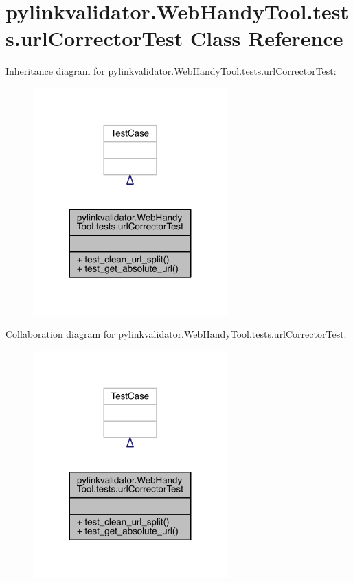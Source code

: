 \hypertarget{classpylinkvalidator_1_1_web_handy_tool_1_1tests_1_1url_corrector_test}{}\section{pylinkvalidator.\+Web\+Handy\+Tool.\+tests.\+url\+Corrector\+Test Class Reference}
\label{classpylinkvalidator_1_1_web_handy_tool_1_1tests_1_1url_corrector_test}


Inheritance diagram for pylinkvalidator.\+Web\+Handy\+Tool.\+tests.\+url\+Corrector\+Test\+:
\nopagebreak
\begin{figure}[H]
\begin{center}
\leavevmode
\includegraphics[width=212pt]{classpylinkvalidator_1_1_web_handy_tool_1_1tests_1_1url_corrector_test__inherit__graph}
\end{center}
\end{figure}


Collaboration diagram for pylinkvalidator.\+Web\+Handy\+Tool.\+tests.\+url\+Corrector\+Test\+:
\nopagebreak
\begin{figure}[H]
\begin{center}
\leavevmode
\includegraphics[width=212pt]{classpylinkvalidator_1_1_web_handy_tool_1_1tests_1_1url_corrector_test__coll__graph}
\end{center}
\end{figure}
